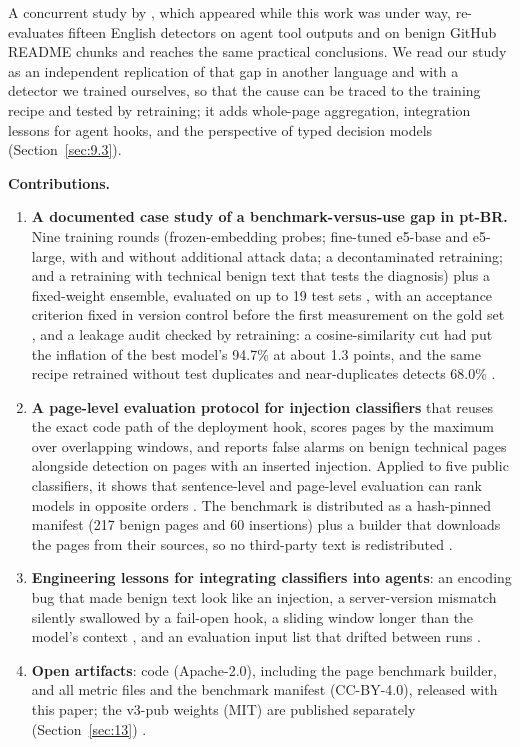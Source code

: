 \documentclass[11pt]{article}
\begin{document}
A concurrent study by \citet{liu2026passing}, which appeared while this work was under way, re-evaluates fifteen English detectors on agent tool outputs and on benign GitHub README chunks and reaches the same practical conclusions. We read our study as an independent replication of that gap in another language and with a detector we trained ourselves, so that the cause can be traced to the training recipe and tested by retraining; it adds whole-page aggregation, integration lessons for agent hooks, and the perspective of typed decision models (Section~\ref{sec:9.3}).

\textbf{Contributions.}

\begin{enumerate}
\item \textbf{A documented case study of a benchmark-versus-use gap in pt-BR.} Nine training rounds (frozen-embedding probes; fine-tuned e5-base and e5-large, with and without additional attack data; a decontaminated retraining; and a retraining with technical benign text that tests the diagnosis) plus a fixed-weight ensemble, evaluated on up to 19 test sets%
, with an acceptance criterion fixed in version control before the first measurement on the gold set%
, and a leakage audit checked by retraining: a cosine-similarity cut had put the inflation of the best model's 94.7\% at about 1.3 points, and the same recipe retrained without test duplicates and near-duplicates detects 68.0\%%
.
\item \textbf{A page-level evaluation protocol for injection classifiers} that reuses the exact code path of the deployment hook, scores pages by the maximum over overlapping windows, and reports false alarms on benign technical pages alongside detection on pages with an inserted injection. Applied to five public classifiers, it shows that sentence-level and page-level evaluation can rank models in opposite orders%
. The benchmark is distributed as a hash-pinned manifest (217 benign pages and 60 insertions) plus a builder that downloads the pages from their sources, so no third-party text is redistributed%
.
\item \textbf{Engineering lessons for integrating classifiers into agents}: an encoding bug that made benign text look like an injection, a server-version mismatch silently swallowed by a fail-open hook, a sliding window longer than the model's context%
, and an evaluation input list that drifted between runs%
.
\item \textbf{Open artifacts}: code (Apache-2.0), including the page benchmark builder, and all metric files and the benchmark manifest (CC-BY-4.0), released with this paper; the v3-pub weights (MIT) are published separately (Section~\ref{sec:13})%
.
\end{enumerate}
\end{document}
